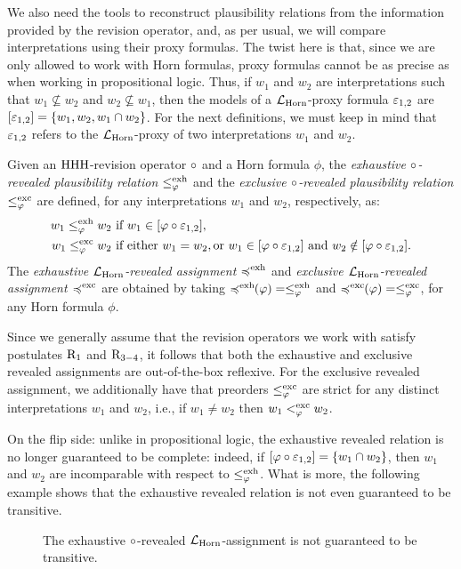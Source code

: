 We also need the tools to reconstruct plausibility relations 
from the information provided by the revision operator,
and, as per usual, we will compare interpretations using their proxy formulas.
The twist here is that, since we are only allowed to work with Horn formulas, proxy formulas 
cannot be as precise as when working in propositional logic.
Thus, if $w_1$ and $w_2$ are interpretations such that $w_1\not\subseteq w_2$
and $w_2\not\subseteq w_1$, then the models of a $\mathcal{L}_{\mathrm{Horn}}$-proxy formula $\varepsilon_{1,2}$
are $[\varepsilon_{1,2}]=\{w_1,w_2,w_1\cap w_2\}$.
For the next definitions, we must keep in mind that $\varepsilon_{1,2}$ refers
to the $\mathcal{L}_{\mathrm{Horn}}$-proxy of two interpretations $w_1$ and $w_2$.

Given an ${\mathrm{HHH}}$-revision operator $\circ$ and a Horn formula $\phi$,
the \emph{exhaustive $\circ$-revealed plausibility relation $\le^{\operatorname{exh}}_\varphi$} 
and the \emph{exclusive $\circ$-revealed plausibility relation $\le^{\operatorname{exc}}_\varphi$} 
are defined, for any interpretations $w_1$ and $w_2$, respectively, as:
\begin{align*}
	w_1\le^{\operatorname{exh}}_\varphi w_2 &~\text{if}~w_1\in[\varphi\circ\varepsilon_{1,2}],\\
	w_1\le^{\operatorname{exc}}_\varphi w_2 &~\text{if either}~w_1=w_2,
			\text{or}~w_1\in[\varphi\circ\varepsilon_{1,2}]~\text{and}~w_2\notin[\varphi\circ\varepsilon_{1,2}].
\end{align*}
The \emph{exhaustive $\mathcal{L}_{\mathrm{Horn}}$-revealed assignment $\preccurlyeq^{\operatorname{exh}}$} 
and \emph{exclusive $\mathcal{L}_{\mathrm{Horn}}$-revealed assignment $\preccurlyeq^{\operatorname{exc}}$} are obtained
by taking $\preccurlyeq^{\operatorname{exh}}\!\!(\varphi)=\le^{\operatorname{exh}}_\varphi$ and $\preccurlyeq^{\operatorname{exc}}\!\!(\varphi)=\le^{\operatorname{exc}}_\varphi$, 
for any Horn formula $\phi$.

Since we generally assume that the revision operators we work with 
satisfy postulates $\mathrm{R}_{1}$ and $\mathrm{R}_{3-4}$,
it follows that both the exhaustive and exclusive revealed assignments 
are out-of-the-box reflexive.
For the exclusive revealed assignment,
we additionally have that preorders $\le^{{\operatorname{exc}}}_{\varphi}$ are 
strict for any distinct interpretations $w_1$ and $w_2$,
i.e., if $w_1\neq w_2$ then $w_1 <^{{\operatorname{exc}}}_{\varphi} w_2$.

On the flip side: unlike in propositional logic,
the exhaustive revealed relation is no longer guaranteed to
be complete: 
indeed, if $[\varphi\circ \varepsilon_{1,2}]=\{w_1\cap w_2\}$,
then $w_1$ and $w_2$ are incomparable with respect to $\le^{{\operatorname{exh}}}_{\varphi}$.
What is more, the following example shows that the 
exhaustive revealed relation is not even guaranteed to be transitive.

\begin{figure}\centering
	\caption{
		The exhaustive $\circ$-revealed $\mathcal{L}_{\mathrm{Horn}}$-assignment 
		is not guaranteed to be transitive.
	}
	\label{fig:6-hhh-revision-exhaustive-revealed-not-transitive}
\end{figure}

